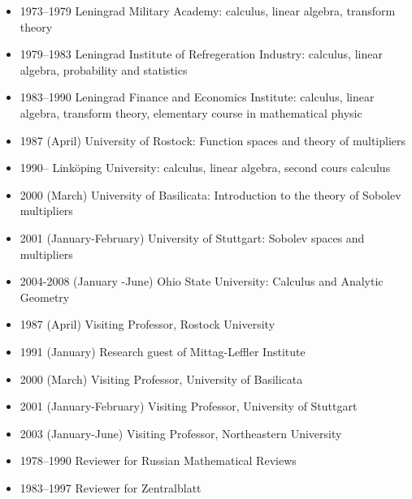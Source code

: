 \documentclass{article}
\begin{document}
\begin{itemize}
         \item 1973--1979 Leningrad Military Academy: calculus, linear 
algebra, transform theory
         \item 1979--1983 Leningrad Institute of Refregeration 
Industry: calculus, linear algebra, probability and statistics
         \item 1983--1990 Leningrad Finance and Economics Institute: 
calculus, linear algebra, transform theory, elementary course
         in mathematical physic
         \item 1987 (April) University of Rostock: Function spaces and 
theory of multipliers
         \item 1990-- Link\"oping University: calculus, linear 
algebra, second cours calculus
         \item 2000 (March) University of Basilicata: Introduction to 
the theory of Sobolev multipliers
         \item 2001 (January-February) University of Stuttgart: 
Sobolev spaces and multipliers
        \item 2004-2008 (January -June) Ohio State University: Calculus and Analytic Geometry
\end{itemize}


\begin{itemize}
         \item 1987 (April) Visiting Professor, Rostock University
         \item 1991 (January) Research guest of Mittag-Leffler Institute
         \item 2000 (March) Visiting Professor, University of Basilicata
         \item 2001 (January-February) Visiting Professor, University 
of Stuttgart
         \item 2003 (January-June) Visiting Professor,
Northeastern University         
\item 1978--1990 Reviewer for Russian Mathematical Reviews
         \item 1983--1997 Reviewer for Zentralblatt
\end{itemize}
\end{document}
